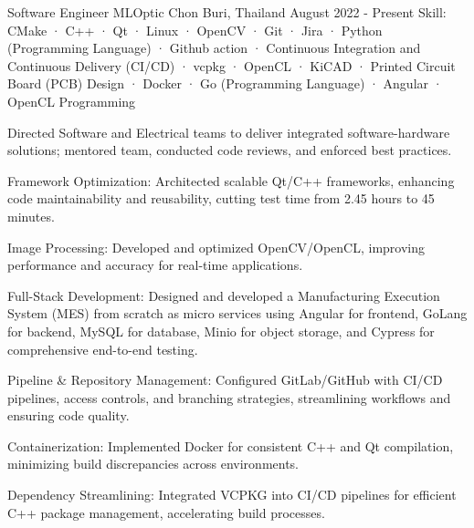 
\begin{cventries}

  \cventry
    {Software Engineer} %
    {MLOptic} %
    {Chon Buri, Thailand} %
    {August 2022 - Present} %
    {Skill: CMake · C++ · Qt · Linux · OpenCV · Git · Jira · Python (Programming Language) · Github action · Continuous Integration and Continuous Delivery (CI/CD) · vcpkg · OpenCL · KiCAD · Printed Circuit Board (PCB) Design · Docker · Go (Programming Language) · Angular · OpenCL Programming} %
    {
      \begin{cvitems} %
      \item {Directed Software and Electrical teams to deliver integrated software-hardware solutions; mentored team, conducted code reviews, and enforced best practices.}
      \item {Framework Optimization: Architected scalable Qt/C++ frameworks, enhancing code maintainability and reusability, cutting test time from 2.45 hours to 45 minutes.}
      \item {Image Processing: Developed and optimized OpenCV/OpenCL, improving performance and accuracy for real-time applications.}
      \item {Full-Stack Development: Designed and developed a Manufacturing Execution System (MES) from scratch as micro services using Angular for frontend, GoLang for backend, MySQL for database, Minio for object storage, and Cypress for comprehensive end-to-end testing.}
      \item {Pipeline \& Repository Management: Configured GitLab/GitHub with CI/CD pipelines, access controls, and branching strategies, streamlining workflows and ensuring code quality.}
      \item {Containerization: Implemented Docker for consistent C++ and Qt compilation, minimizing build discrepancies across environments.}
      \item {Dependency Streamlining: Integrated VCPKG into CI/CD pipelines for efficient C++ package management, accelerating build processes.}

\end{cvitems}}
\end{cventries}
